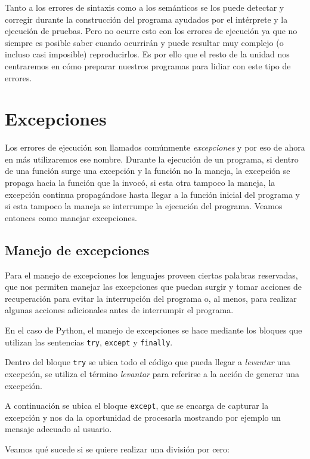 Tanto a los errores de sintaxis como a los semánticos se los puede detectar y
corregir durante la construcción del programa ayudados por el intérprete y
la ejecución de pruebas. Pero no ocurre esto con los errores de ejecución ya
que no siempre es posible saber cuando ocurrirán y puede resultar muy complejo
(o incluso casi imposible) reproducirlos. Es por ello que el resto de la
unidad nos centraremos en cómo preparar nuestros programas para lidiar con
este tipo de errores.

\section{Excepciones}

Los errores de ejecución son llamados comúnmente {\it excepciones} y por eso
de ahora en más utilizaremos ese nombre. Durante la ejecución de un programa,
si dentro de una función surge una excepción y la función no la maneja, la
excepción se propaga hacia la función que la invocó, si esta otra tampoco la
maneja, la excepción continua propagándose hasta llegar a la función inicial
del programa y si esta tampoco la maneja se interrumpe la ejecución del
programa. Veamos entonces como manejar excepciones.

\subsection{Manejo de excepciones}

Para el manejo de excepciones los lenguajes proveen ciertas palabras
reservadas, que nos permiten manejar las excepciones que puedan surgir y
tomar acciones de recuperación para evitar la interrupción del programa o,
al menos, para realizar algunas acciones adicionales antes de interrumpir
el programa.

En el caso de Python, el manejo de excepciones se hace mediante los
bloques que utilizan las sentencias \lstinline!try!, \lstinline!except! y
\lstinline!finally!.

Dentro del bloque \lstinline!try! se ubica todo el código que pueda llegar
a {\it levantar} una excepción, se utiliza el término {\it levantar} para
referirse a la acción de generar una excepción.

A continuación se ubica el bloque \lstinline!except!, que se encarga de
capturar la excepción y nos da la oportunidad de procesarla mostrando por
ejemplo un mensaje adecuado al usuario.

Veamos qué sucede si se quiere realizar una división por cero:

